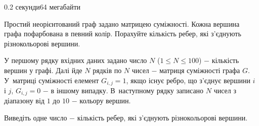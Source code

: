\begin{problem}{}{}{}{0.2 секунди}{64 мегабайти}

Простий неорієнтований граф задано матрицею суміжності. Кожна вершина графа пофарбована в певний колір.
Порахуйте кількість ребер, які з'єднують різнокольорові вершини.

\InputFile
У першому рядку вхідних даних задано число $N$ ($1 \le N \le 100$) $-$ кількість вершин у графі.
Далі йде $N$ рядків по $N$ чисел $-$ матриця суміжності графа $G$.
У~матриці суміжності елемент $G_{i,j}=1$, якщо існує ребро, що з'єднує вершини $i$ і $j$, $G_{i,j}=0$ $-$ в іншому випадку.
В~наступному рядку записано $N$ чисел з діапазону від $1$ до $10$ $-$ кольору вершин.

\OutputFile
Виведіть одне число $-$ кількість ребер, які з'єднують різнокольорові вершини.

\Example

\begin{example}
%
\end{example}

\end{problem}
